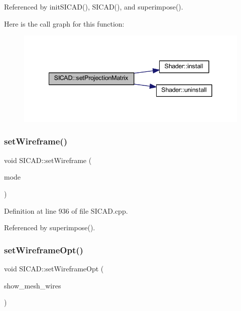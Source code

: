 Referenced by init\+S\+I\+C\+A\+D(), S\+I\+C\+A\+D(), and superimpose().

Here is the call graph for this function\+:
\nopagebreak
\begin{figure}[H]
\begin{center}
\leavevmode
\includegraphics[width=341pt]{classSICAD_a39cdff6871d32429d8ba95b776e0b874_cgraph}
\end{center}
\end{figure}
\mbox{\label{classSICAD_ae7af7aba5d81b9f1cc3e273a55811a70}} 
\subsubsection{\texorpdfstring{set\+Wireframe()}{setWireframe()}}
{\footnotesize\ttfamily void S\+I\+C\+A\+D\+::set\+Wireframe (\begin{DoxyParamCaption}\item[{G\+Lenum}]{mode }\end{DoxyParamCaption})\hspace{0.3cm}{\ttfamily [private]}}



Definition at line 936 of file S\+I\+C\+A\+D.\+cpp.



Referenced by superimpose().

\mbox{\label{classSICAD_a4cf80a273b6b0d946cd298472c63ddd4}} 
\subsubsection{\texorpdfstring{set\+Wireframe\+Opt()}{setWireframeOpt()}}
{\footnotesize\ttfamily void S\+I\+C\+A\+D\+::set\+Wireframe\+Opt (\begin{DoxyParamCaption}\item[{bool}]{show\+\_\+mesh\+\_\+wires }\end{DoxyParamCaption})}



